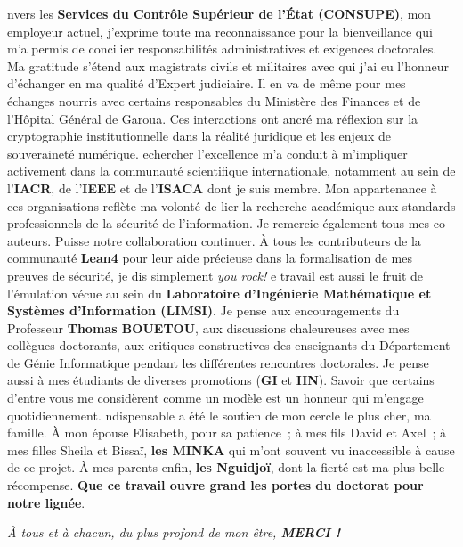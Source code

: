 nvers les \textbf{Services du Contr\^ole Sup\'erieur de l'\'Etat (CONSUPE)}, mon employeur actuel, j'exprime toute ma reconnaissance pour la bienveillance qui m'a permis de concilier responsabilit\'es administratives et exigences doctorales. Ma gratitude s'\'etend aux magistrats civils et militaires avec qui j'ai eu l'honneur d'\'echanger en ma qualit\'e d'Expert judiciaire. Il en va de m\^eme pour mes \'echanges nourris avec certains responsables du Minist\`ere des Finances et de l'H\^opital G\'en\'eral de Garoua. Ces interactions ont ancr\'e ma r\'eflexion sur la cryptographie institutionnelle dans la r\'ealit\'e juridique et les enjeux de souverainet\'e num\'erique.
\vspace{0.5cm}
echercher l'excellence m'a conduit \`a m'impliquer activement dans la communaut\'e scientifique internationale, notamment au sein de l'\textbf{IACR}, de l'\textbf{IEEE} et de l'\textbf{ISACA} dont je suis membre. Mon appartenance \`a ces organisations refl\`ete ma volont\'e de lier la recherche acad\'emique aux standards professionnels de la s\'ecurit\'e de l'information. Je remercie \'egalement tous mes co-auteurs. Puisse notre collaboration continuer. \`A tous les contributeurs de la communaut\'e \textbf{Lean4} pour leur aide pr\'ecieuse dans la formalisation de mes preuves de s\'ecurit\'e, je dis simplement \textit{you rock!}
\vspace{0.5cm}
e travail est aussi le fruit de l'\'emulation v\'ecue au sein du \textbf{Laboratoire d'Ing\'enierie Math\'ematique et Syst\`emes d'Information (LIMSI)}. Je pense aux encouragements du Professeur \textbf{Thomas BOUETOU}, aux discussions chaleureuses avec mes coll\`egues doctorants, aux critiques constructives des enseignants du D\'epartement de G\'enie Informatique pendant les diff\'erentes rencontres doctorales. Je pense aussi \`a mes \'etudiants de diverses promotions (\textbf{GI} et \textbf{HN}). Savoir que certains d'entre vous me consid\`erent comme un mod\`ele est un honneur qui m'engage quotidiennement.
\vspace{0.5cm}
ndispensable a \'et\'e le soutien de mon cercle le plus cher, ma famille. \`A mon \'epouse Elisabeth, pour sa patience~; \`a mes fils David et Axel~; \`a mes filles Sheila et Bissa\"i, \textbf{les MINKA} qui m'ont souvent vu inaccessible \`a cause de ce projet. \`A mes parents enfin, \textbf{les Nguidjo\"i}, dont la fiert\'e est ma plus belle r\'ecompense. \textbf{Que ce travail ouvre grand les portes du doctorat pour notre lign\'ee}.
\vspace{0.4cm}
\begin{flushright}
\textit{\`A tous et \`a chacun, du plus profond de mon \^etre, \textbf{MERCI !}}
\end{flushright}